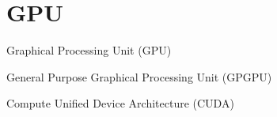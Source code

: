 \chapter{GPU}
Graphical Processing Unit (GPU)

General Purpose Graphical Processing Unit (GPGPU)

Compute Unified Device Architecture (CUDA)

